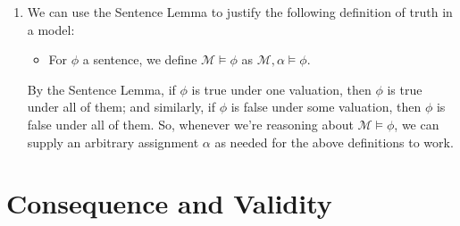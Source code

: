 \begin{enumerate}[\thesection.1]
\begin{proof}
\begin{enumerate}[(i)]
\begin{enumerate}[(a)]
\begin{itemize}
			\end{itemize}
			
			\end{enumerate}
		
		\end{enumerate}
		This concludes our induction.
		\end{proof}
		The Sentence Lemma is a simple corollary of the Formula Locality Lemma.
		
		\item We can use the Sentence Lemma to justify the following definition of truth in a model:
		
		\begin{itemize}
		
			\item For $\phi$ a sentence, we define $\mathcal{M}\vDash\phi$ as $\mathcal{M},\alpha\vDash\phi$.
		
		\end{itemize}
		
		By the Sentence Lemma, if $\phi$ is true under one valuation, then $\phi$ is true under all of them; and similarly, if $\phi$ is false under some valuation, then $\phi$ is false under all of them. So, whenever we're reasoning about $\mathcal{M}\vDash\phi$, we can supply an arbitrary assignment $\alpha$ as needed for the above definitions to work.
				
	\end{enumerate}


\section{Consequence and Validity}


